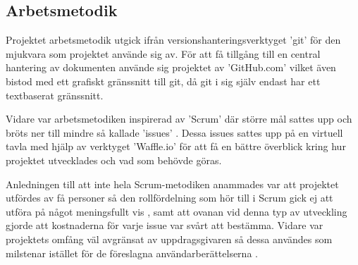 
    \subsection{Arbetsmetodik} %
    \label{sub:arbetsmetodik}
        Projektet arbetsmetodik utgick ifrån versionshanteringsverktyget 'git' 
        för den mjukvara som projektet använde sig av. För att få tillgång 
        till en central hantering av dokumenten använde sig projektet av 'GitHub.com' vilket även bistod med ett grafiskt gränssnitt till git, då git i sig själv endast har ett textbaserat gränssnitt. \bigskip

        Vidare var arbetsmetodiken inspirerad av 'Scrum' där större mål sattes upp och bröts ner till mindre så kallade 'issues' \cite[kap.~8]{scrum}. Dessa issues sattes upp på en virtuell tavla med hjälp av verktyget 'Waffle.io' för att få en bättre överblick kring hur projektet utvecklades och vad som behövde göras. \bigskip

        Anledningen till att inte hela Scrum-metodiken anammades var att projektet utfördes av få personer så den rollfördelning som hör till i Scrum gick ej att utföra på något meningsfullt vis \cite[kap.~6]{scrum}, samt att ovanan vid denna typ av utveckling gjorde att kostnaderna för varje issue var svårt att bestämma. Vidare var projektets omfång väl avgränsat av uppdrags\-givaren så dessa användes som milstenar istället för de föreslagna användarberättelserna \cite[kap.~9]{scrum}. 

